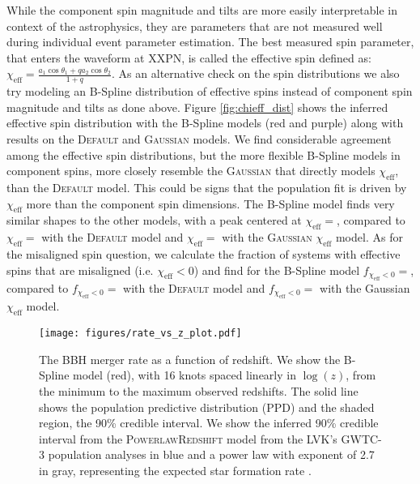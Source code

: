 While the component spin magnitude and tilts are more easily interpretable in context of the astrophysics, they are parameters that 
are not measured well during individual event parameter estimation. The best measured spin parameter, that enters the waveform at XXPN, is 
called the effective spin defined as: $\chi_\mathrm{eff} = \frac{a_1\cos{\theta_1} + qa_2\cos{\theta_2}}{1+q}$. As an alternative check 
on the spin distributions we also try modeling an B-Spline distribution of effective spins instead of component spin magnitude and tilts 
as done above. Figure \ref{fig:chieff_dist} shows the inferred effective spin distribution with the B-Spline models (red and purple) 
along with results on the \textsc{Default} and \textsc{Gaussian} models. We find considerable agreement 
among the effective spin distributions, but the more flexible B-Spline models in component spins, more closely resemble the \textsc{Gaussian} 
that directly models $\chi_\mathrm{eff}$, than the \textsc{Default} model. This could be signs that the population fit is driven by $\chi_\mathrm{eff}$ 
more than the component spin dimensions. The B-Spline model finds very similar shapes to the other models, with a peak centered at 
$\chi_\mathrm{eff}=$\result{$\CIPlusMinus{\macros[ChiEffective][iid][PeakChiEff]}$}, compared to 
$\chi_\mathrm{eff}=$\result{$\CIPlusMinus{\macros[ChiEffective][default][PeakChiEff]}$} with the \textsc{Default} model and 
$\chi_\mathrm{eff}=$\result{$\CIPlusMinus{\macros[ChiEffective][gaussian][PeakChiEff]}$} with the \textsc{Gaussian} $\chi_\mathrm{eff}$ model. 
As for the misaligned spin question, we calculate the fraction of systems with effective spins that are misaligned (i.e. $\chi_\mathrm{eff}<0$) and 
find for the B-Spline model $f_{\chi_\mathrm{eff}<0}=$\result{$\CIPlusMinus{\macros[ChiEffective][iid][FracBelow0]}$}, compared to 
$f_{\chi_\mathrm{eff}<0}=$\result{$\CIPlusMinus{\macros[ChiEffective][default][FracBelow0]}$} with the \textsc{Default} model and 
$f_{\chi_\mathrm{eff}<0}=$\result{$\CIPlusMinus{\macros[ChiEffective][gaussian][FracBelow0]}$} with the Gaussian $\chi_\mathrm{eff}$ model.

\begin{figure}[h]
    \texttt{[image: figures/rate\_vs\_z\_plot.pdf]}
    \caption{The BBH merger rate as a function of redshift. We show the B-Spline model (red), with 16 knots spaced linearly in $\log(z)$, 
    from the minimum to the maximum observed redshifts. The solid line shows the population predictive distribution (PPD) and the shaded region, 
    the 90\% credible interval. We show the inferred 90\% credible interval from the \textsc{PowerlawRedshift} model 
    from the LVK's GWTC-3 population analyses in blue and a power law with exponent of 2.7 in gray, representing the expected star formation rate 
    \citep{Madau_2014, o3b_astro_dist}.}
    \label{fig:rofz}
\end{figure}

